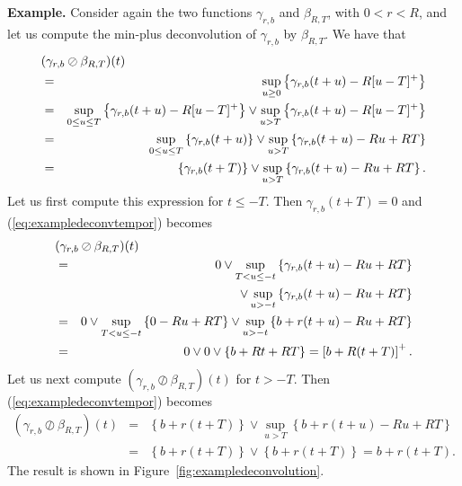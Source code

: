 {\bf Example.} Consider again the two functions $\gamma_{r,b}$ and $\beta_{R,T}$,
with $0 < r < R$, and let us compute the min-plus deconvolution of  $\gamma_{r,b}$ by $\beta_{R,T}$.
We have that
\begin{eqnarray}
\lefteqn{ (\gamma_{r,b} \oslash \beta_{R,T})(t)} \nonumber \\
        & = & \sup_{u \geq 0} \left\{ \gamma_{r,b}(t+u) -  R[u-T]^{+} \right\} \nonumber \\
        & = & \sup_{0 \leq u \leq T} \left\{ \gamma_{r,b}(t+u) -  R[u-T]^{+} \right\}
            \vee \sup_{u > T} \left\{ \gamma_{r,b}(t+u) -  R[u-T]^{+} \right\} \nonumber \\
        & = & \sup_{0 \leq u \leq T} \left\{ \gamma_{r,b}(t+u) \right\}
            \vee \sup_{u > T} \left\{ \gamma_{r,b}(t+u) -  Ru + RT \right\} \nonumber \\
        & = & \left\{ \gamma_{r,b}(t+T) \right\}
            \vee \sup_{u > T} \left\{ \gamma_{r,b}(t+u) -  Ru + RT \right\} .
\mylabel{eq:exampledeconvtempor}
\end{eqnarray}
Let us first compute this expression for $t \leq -T$. Then $\gamma_{r,b}(t+T) = 0$ and
(\ref{eq:exampledeconvtempor}) becomes
\begin{eqnarray*}
\lefteqn{(\gamma_{r,b} \oslash \beta_{R,T})(t)}\\
& = & 0 \vee
\sup_{T < u \leq -t} \left\{ \gamma_{r,b}(t+u) -  Ru + RT \right\}
\\
            & & \hspace{10 ex} \vee \sup_{u > -t} \left\{ \gamma_{r,b}(t+u) -  Ru + RT \right\} \\
        & = & 0 \vee \sup_{T < u \leq -t} \left\{ 0  -  Ru + RT \right\}
                    \vee \sup_{u > -t} \left\{ b+ r(t+u) -  Ru + RT \right\} \\
        & = & 0 \vee 0 \vee \left\{ b + Rt + RT \right\} = \left[ b + R(t+T) \right]^{+} .
\end{eqnarray*}
Let us next compute $(\gamma_{r,b} \oslash \beta_{R,T})(t)$ for $t > -T$. Then (\ref{eq:exampledeconvtempor}) becomes
\begin{eqnarray*}
(\gamma_{r,b} \oslash \beta_{R,T})(t) & = & \left\{ b + r(t+T) \right\} \vee \sup_{u > T} \left\{ b + r(t+u) -  Ru + RT \right\} \\
                & = & \left\{ b + r(t+T) \right\} \vee \left\{ b + r(t+T) \right\} =  b + r(t+T).
\end{eqnarray*}
The result is shown in Figure~\ref{fig:exampledeconvolution}.
\begin{figure}[!htbp]
\end{figure}


